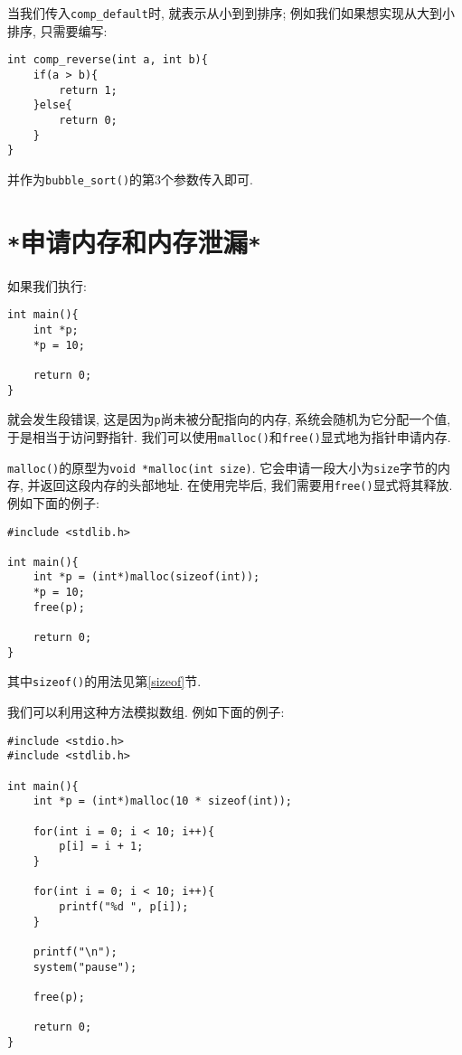         当我们传入\texttt{comp\_default}时, 就表示从小到到排序; 例如我们如果想实现从大到小排序, 只需要编写:
\begin{lstlisting}
int comp_reverse(int a, int b){
    if(a > b){
        return 1;
    }else{
        return 0;
    }
}
\end{lstlisting}

        并作为\texttt{bubble\_sort()}的第3个参数传入即可.

    \section{\texttt{*}申请内存和内存泄漏\texttt{*}} \label{申请内存和内存泄漏}
        如果我们执行:
\begin{lstlisting}
int main(){
    int *p;
    *p = 10;

    return 0;
}
\end{lstlisting}

        就会发生段错误, 这是因为\texttt{p}尚未被分配指向的内存, 系统会随机为它分配一个值, 于是相当于访问野指针. 我们可以使用\texttt{malloc()}和\texttt{free()}显式地为指针申请内存.

        \texttt{malloc()}的原型为\texttt{void *malloc(int size)}. 它会申请一段大小为\texttt{size}字节的内存, 并返回这段内存的头部地址. 在使用完毕后, 我们需要用\texttt{free()}显式将其释放. 例如下面的例子:
\begin{lstlisting}
#include <stdlib.h>

int main(){
    int *p = (int*)malloc(sizeof(int));
    *p = 10;
    free(p);

    return 0;
}
\end{lstlisting}

        其中\texttt{sizeof()}的用法见第\ref{sizeof}节.

        我们可以利用这种方法模拟数组. 例如下面的例子:
\begin{lstlisting}
#include <stdio.h>
#include <stdlib.h>

int main(){
    int *p = (int*)malloc(10 * sizeof(int));

    for(int i = 0; i < 10; i++){
        p[i] = i + 1;
    }

    for(int i = 0; i < 10; i++){
        printf("%d ", p[i]);
    }

    printf("\n");
    system("pause");

    free(p);

    return 0;
}
\end{lstlisting}

